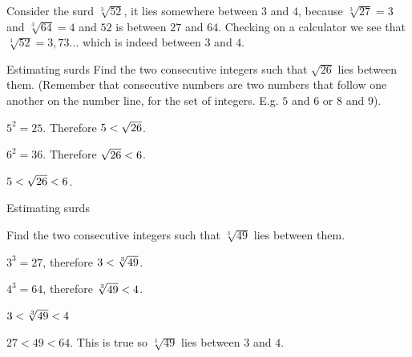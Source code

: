 \par
       



Consider the surd $\sqrt[3]{52}$, it lies somewhere between $3$ and $4$, because $\sqrt[3]{27}=3$ and $\sqrt[3]{64}=4$ and $52$ is between $27$ and $64$. Checking on a calculator we see that $\sqrt[3]{52}=3,73\ldots$ which is indeed between $3$ and $4$.\par 

\begin{wex}{Estimating surds}
{
Find the two consecutive integers such that $\sqrt{26}$ lies between them.
(Remember that consecutive numbers are two numbers that follow one another on the number line, for the set of integers. E.g. $5$ and $6$ or $8$ and $9$).
}
{
           
${5}^{2}=25$. Therefore $5<{}\sqrt{26}$.

${6}^{2}=36$. 
Therefore $\sqrt{26}<{}6$.

$5<{}\sqrt{26}<{}6$. 
}
\end{wex}


\begin{wex}{Estimating surds }{

Find the two consecutive integers such that $\sqrt[3]{49}$ lies between them.
}
{
   ${3}^{3}=27$, therefore $3<{}\sqrt[3]{49}$.

 ${4}^{3}=64$, therefore $\sqrt[3]{49}<{}4$. 

$3<{}\sqrt[3]{49}<{}4$

$27<49<64$. This is true so $\sqrt[3]{49}$ lies between $3$ and $4$.

}
\end{wex}

